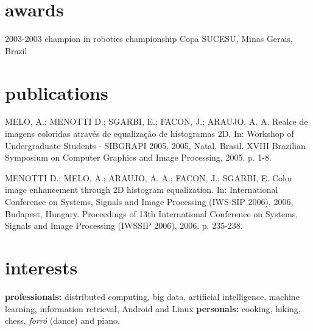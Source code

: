\documentclass[]{friggeri-cv}
\begin{document}
\section{awards}


\begin{entrylist}

\entry
{2003-2003} 
{champion {\normalfont in robotics championship}}
{Copa SUCESU, Minas Gerais, Brazil}

\end{entrylist}

\section{publications}

MELO, A.; MENOTTI D.; SGARBI, E.; FACON, J.; ARAUJO, A. A. Realce de imagens coloridas através de equalização de histogramas 2D. In: Workshop of Undergraduate Students - SIBGRAPI 2005, 2005, Natal, Brasil. XVIII Brazilian Symposium on Computer Graphics and Image Processing, 2005. p. 1-8.

MENOTTI D.; MELO, A.; ARAUJO, A. A.; FACON, J.; SGARBI, E. Color image enhancement through 2D histogram equalization. In: International Conference on Systems, Signals and Image Processing (IWS-SIP 2006), 2006, Budapest, Hungary. Proceedings of 13th International Conference on Systems, Signals and Image Processing (IWSSIP 2006), 2006. p. 235-238.

\section{interests}

\textbf{professionals:} distributed computing, big data, artificial intelligence, machine learning, information retrieval, Android and Linux \textbf{personals:} cooking, hiking,  chess, \textit{forró} (dance) and piano.
\end{document}
